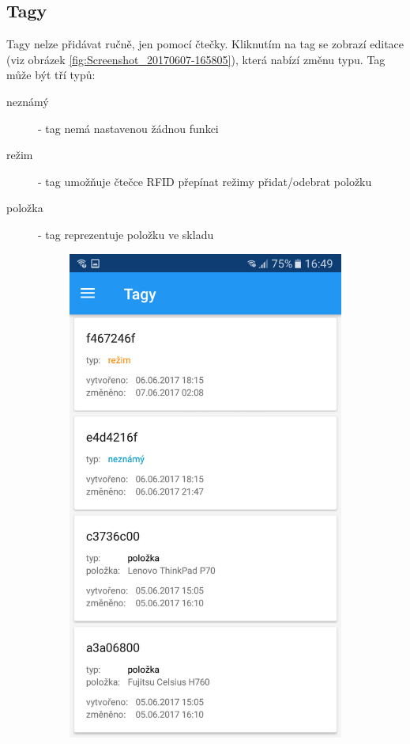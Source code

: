 \documentclass[czech,BP]{thesiskiv}
\begin{document}
\subsection{Tagy}
Tagy nelze přidávat ručně, jen pomocí čtečky. Kliknutím na tag se zobrazí editace (viz obrázek \ref{fig:Screenshot_20170607-165805}), která nabízí změnu typu. Tag může být tří typů:
\begin{description}
\item [neznámý] - tag nemá nastavenou žádnou funkci
\item [režim] - tag umožňuje čtečce RFID přepínat režimy přidat/odebrat položku
\item [položka] - tag reprezentuje položku ve skladu 
\end{description}
\begin{figure}[H]
	\centering
  \begin{subfigure}[b]{0.3\textwidth}
    \centering
	\includegraphics[width=\textwidth]{../images/client_android/Screenshot_20170607-164958.png}	

\end{subfigure}
\end{figure}
\end{document}
